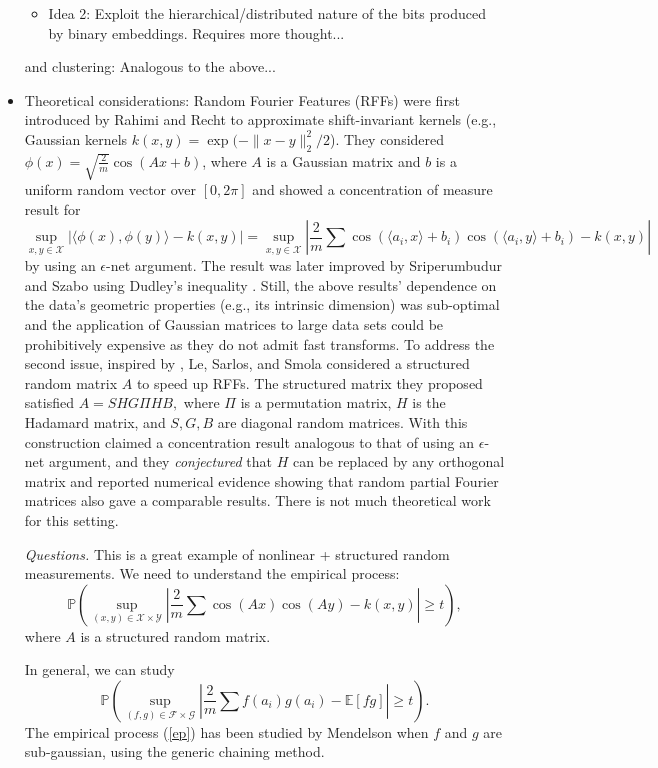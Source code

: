 \begin{itemize}
{\begin{itemize}
    \item Idea 2: Exploit the hierarchical/distributed nature of the bits produced by binary embeddings. Requires more thought...
\end{itemize} 
and clustering: Analogous to the above...}
\item {} Theoretical considerations: Random Fourier Features (RFFs) were first introduced by Rahimi and Recht \cite{RR2008} to approximate shift-invariant kernels (e.g., Gaussian kernels $k(x, y) = \exp(-\|x - y\|_2^2/2$). They considered $\phi(x) = \sqrt{\frac{2}{m}}\cos(Ax + b)$, where $A$ is a Gaussian matrix and $b$ is a uniform random vector over $[0, 2\pi]$ and showed a concentration of measure \cite{} result for $$\sup_{x, y\in\mathcal{X}}|\langle \phi(x), \phi(y)\rangle - k(x, y)| = \sup_{x, y\in\mathcal{X}}|\frac{2}{m}\sum \cos(\langle a_i, x\rangle + b_i)\cos(\langle a_i, y\rangle + b_i) - k(x, y)|$$
by using an $\epsilon$-net argument. The result was later improved by Sriperumbudur and Szabo \cite{SS2015} using Dudley's inequality \cite{}. Still, the above results' dependence on the data's geometric properties (e.g., its intrinsic dimension) was sub-optimal and the application of Gaussian matrices to large data sets could be prohibitively expensive as they do not admit fast transforms. To address the second issue, inspired by \cite{DKS2011}, Le, Sarlos, and Smola \cite{LSS2013, LSS2014} considered a structured random matrix $A$ to speed up RFFs. The structured matrix they proposed satisfied $A= SHG\Pi HB,$
where $\Pi$ is 	a permutation matrix, $H$ is the Hadamard matrix, and $S, G, B$ are diagonal random matrices. With this construction \cite{LSS2014} claimed a concentration result analogous to that of \cite{RR2008} using an $\epsilon$-net argument, and they \emph{conjectured} that $H$ can be replaced by any orthogonal matrix and reported numerical evidence showing that random partial Fourier matrices also gave a comparable results. There is not much theoretical work for this setting.

\textit{Questions.} This is a great example of nonlinear + structured random measurements. We need to understand the empirical process:
\[
	\mathbb{P}\left(\sup_{(x, y)\in\mathcal{X}\times\mathcal{Y}} \left|\frac{2}{m}\sum\cos(Ax)\cos(Ay) - k(x, y)\right| \geq t\right),
\]
where $A$ is a structured random matrix.

In general, we can study 
\begin{equation}\label{ep}
	\mathbb{P}\left(\sup_{(f, g)\in\mathcal{F}\times\mathcal{G}} \left|\frac{2}{m}\sum f(a_i)g(a_i) - \mathbb{E}[fg]\right| \geq t\right).
\end{equation}
The empirical process (\ref{ep}) has been studied by Mendelson \cite{Mendelson} when $f$ and $g$ are sub-gaussian, using the generic chaining method.


\end{itemize}
